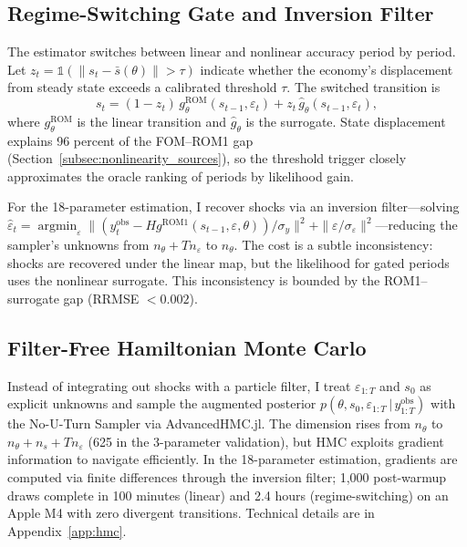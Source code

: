 \documentclass[12pt]{article}
\theoremstyle{plain}
\theoremstyle{definition}
\theoremstyle{remark}
\DeclareMathOperator{\argmin}{argmin}
\newcommand{\given}{\,|\,}
\newcommand{\eps}{\varepsilon}
\begin{document}
\subsection{Regime-Switching Gate and Inversion Filter}
\label{subsec:regime_switching}

The estimator switches between linear and nonlinear accuracy period by period. Let $z_t = \mathbb{1}(\|s_t - \bar{s}(\theta)\| > \tau)$ indicate whether the economy's displacement from steady state exceeds a calibrated threshold $\tau$. The switched transition is
\begin{equation*}
s_t = (1-z_t)\,g_\theta^{\text{ROM}}(s_{t-1}, \eps_t) + z_t\,\hat{g}_\theta(s_{t-1}, \eps_t),
\end{equation*}
where $g_\theta^{\text{ROM}}$ is the linear transition and $\hat{g}_\theta$ is the surrogate. State displacement explains 96 percent of the FOM--ROM1 gap (Section~\ref{subsec:nonlinearity_sources}), so the threshold trigger closely approximates the oracle ranking of periods by likelihood gain.

For the 18-parameter estimation, I recover shocks via an inversion filter---solving $\hat{\eps}_t = \argmin_{\eps} \| (y_t^{\text{obs}} - Hg^{\text{ROM1}}(s_{t-1}, \eps, \theta))/\sigma_y \|^2 + \| \eps/\sigma_\eps \|^2$---reducing the sampler's unknowns from $n_\theta + Tn_\eps$ to $n_\theta$. The cost is a subtle inconsistency: shocks are recovered under the linear map, but the likelihood for gated periods uses the nonlinear surrogate. This inconsistency is bounded by the ROM1--surrogate gap (RRMSE $< 0.002$).

\subsection{Filter-Free Hamiltonian Monte Carlo}
\label{subsec:hmc}

Instead of integrating out shocks with a particle filter, I treat $\eps_{1:T}$ and $s_0$ as explicit unknowns and sample the augmented posterior $p(\theta, s_0, \eps_{1:T} \given y_{1:T}^{\text{obs}})$ with the No-U-Turn Sampler \citep{hoffman2014nuts} via AdvancedHMC.jl. The dimension rises from $n_\theta$ to $n_\theta + n_s + Tn_\eps$ (625 in the 3-parameter validation), but HMC exploits gradient information to navigate efficiently. In the 18-parameter estimation, gradients are computed via finite differences through the inversion filter; 1,000 post-warmup draws complete in 100 minutes (linear) and 2.4 hours (regime-switching) on an Apple M4 with zero divergent transitions. Technical details are in Appendix~\ref{app:hmc}.
\end{document}
